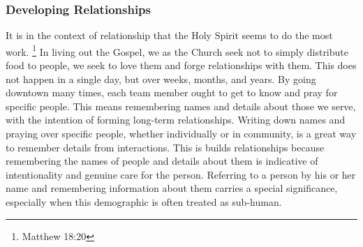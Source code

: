 \subsubsection{Developing Relationships}

    It is in the context of relationship that the Holy Spirit seems to do the most work.
    \footnote{Matthew 18:20}
    In living out the Gospel, we as the Church seek not to simply distribute food to people, we seek to love them and forge relationships with them.
    This does not happen in a single day, but over weeks, months, and years.
    By going downtown many times, each team member ought to get to know and pray for specific people.
    This means remembering names and details about those we serve, with the intention of forming long-term relationships.
    Writing down names and praying over specific people, whether individually or in community, is a great way to remember details from interactions.
    This is builds relationships because remembering the names of people and details about them is indicative of intentionality and genuine care for the person.
    Referring to a person by his or her name and remembering information about them carries a special significance, especially when this demographic is often treated as sub-human.


